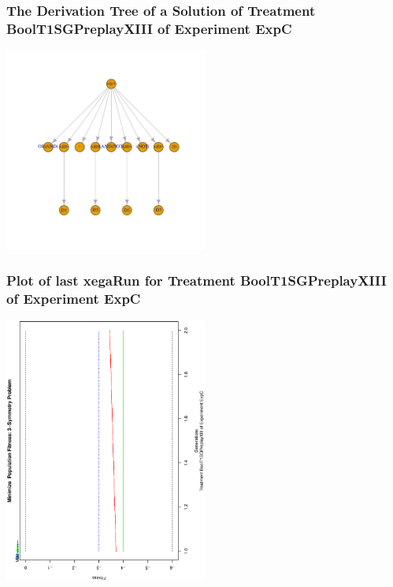 \documentclass[18pt,c]{beamer}
\begin{document}
 \begin{frame}
 \frametitle{ The Derivation Tree of a Solution of Treatment BoolT1SGPreplayXIII of Experiment ExpC }
 \begin{center}
\includegraphics[width=0.5\textwidth, angle=0]
{ExpCDerivationTreeFigure000.pdf}
 \end{center}
 \label{report/ExpCDerivationTreeFigure000.pdf}  
 \end{frame}

 \begin{frame}
 \frametitle{ Plot of last xegaRun for Treatment BoolT1SGPreplayXIII of Experiment ExpC }
 \begin{center}
\includegraphics[width=0.5\textwidth, angle=-90]
{ExpCPlotPopStatsFigure000.eps}
 \end{center}
 \label{report/ExpCPlotPopStatsFigure000.eps}  
 \end{frame}
\end{document}
